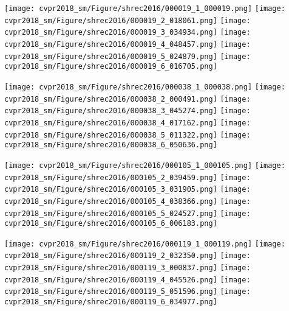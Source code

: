 \documentclass[10pt,twocolumn,letterpaper]{article}
\begin{document}
\begin{figure*}[h] 
        \centering
        \texttt{[image: cvpr2018\_sm/Figure/shrec2016/000019\_1\_000019.png]}
        \texttt{[image: cvpr2018\_sm/Figure/shrec2016/000019\_2\_018061.png]}
        \texttt{[image: cvpr2018\_sm/Figure/shrec2016/000019\_3\_034934.png]}
        \texttt{[image: cvpr2018\_sm/Figure/shrec2016/000019\_4\_048457.png]}
        \texttt{[image: cvpr2018\_sm/Figure/shrec2016/000019\_5\_024879.png]}
        \texttt{[image: cvpr2018\_sm/Figure/shrec2016/000019\_6\_016705.png]}
        
        \texttt{[image: cvpr2018\_sm/Figure/shrec2016/000038\_1\_000038.png]}
        \texttt{[image: cvpr2018\_sm/Figure/shrec2016/000038\_2\_000491.png]}
        \texttt{[image: cvpr2018\_sm/Figure/shrec2016/000038\_3\_045274.png]}
        \texttt{[image: cvpr2018\_sm/Figure/shrec2016/000038\_4\_017162.png]}
        \texttt{[image: cvpr2018\_sm/Figure/shrec2016/000038\_5\_011322.png]}
        \texttt{[image: cvpr2018\_sm/Figure/shrec2016/000038\_6\_050636.png]}
        
        \texttt{[image: cvpr2018\_sm/Figure/shrec2016/000105\_1\_000105.png]}
        \texttt{[image: cvpr2018\_sm/Figure/shrec2016/000105\_2\_039459.png]}
        \texttt{[image: cvpr2018\_sm/Figure/shrec2016/000105\_3\_031905.png]}
        \texttt{[image: cvpr2018\_sm/Figure/shrec2016/000105\_4\_038366.png]}
        \texttt{[image: cvpr2018\_sm/Figure/shrec2016/000105\_5\_024527.png]}
        \texttt{[image: cvpr2018\_sm/Figure/shrec2016/000105\_6\_006183.png]}
        
        \texttt{[image: cvpr2018\_sm/Figure/shrec2016/000119\_1\_000119.png]}
        \texttt{[image: cvpr2018\_sm/Figure/shrec2016/000119\_2\_032350.png]}
        \texttt{[image: cvpr2018\_sm/Figure/shrec2016/000119\_3\_000837.png]}
        \texttt{[image: cvpr2018\_sm/Figure/shrec2016/000119\_4\_045526.png]}
        \texttt{[image: cvpr2018\_sm/Figure/shrec2016/000119\_5\_051596.png]}
        \texttt{[image: cvpr2018\_sm/Figure/shrec2016/000119\_6\_034977.png]}
        

\end{figure*}
\end{document}
